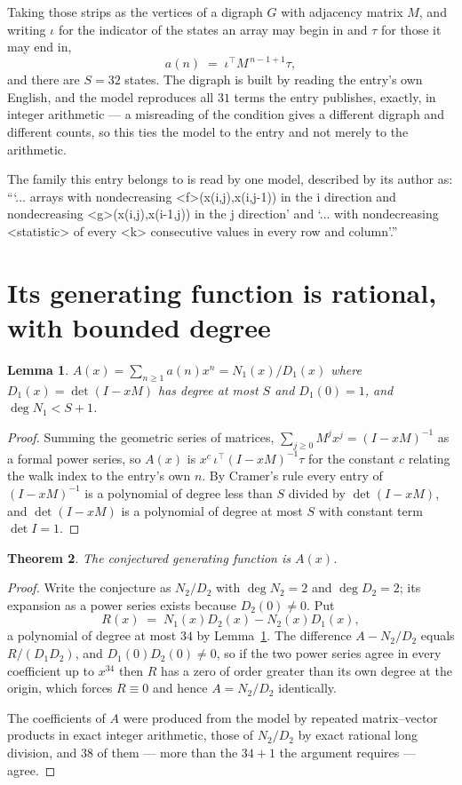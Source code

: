 \documentclass[11pt,a4paper]{article}
\theoremstyle{plain}
\newtheorem{theorem}{Theorem}
\newtheorem{lemma}[theorem]{Lemma}
\theoremstyle{definition}
\begin{document}
Taking those strips as the vertices of a digraph $G$ with adjacency matrix $M$, and writing
$\iota$ for the indicator of the states an array may begin in and $\tau$ for those it may end
in,
\[
a(n)\;=\;\iota^{\!\top}M^{\,n-1+1}\tau ,
\]
and there are $S=32$ states. The digraph is built by reading the entry's own English, and the
model reproduces all $31$ terms the entry publishes, exactly, in integer arithmetic --- a
misreading of the condition gives a different digraph and different counts, so this ties the
model to the entry and not merely to the arithmetic.

The family this entry belongs to is read by one model, described by its author as: ```... arrays with nondecreasing <f>(x(i,j),x(i,j-1)) in the i direction and nondecreasing <g>(x(i,j),x(i-1,j)) in the j direction' and `... with nondecreasing <statistic> of every <k> consecutive values in every row and column'.''


\section{Its generating function is rational, with bounded degree}

\begin{lemma}\label{lem:rat}
$A(x)=\sum_{n\ge1}a(n)x^n=N_1(x)/D_1(x)$ where $D_1(x)=\det(I-xM)$ has degree at most
$S$ and $D_1(0)=1$, and $\deg N_1<S+1$.
\end{lemma}

\begin{proof}
Summing the geometric series of matrices, $\sum_{j\ge0}M^jx^j=(I-xM)^{-1}$ as a formal
power series, so $A(x)$ is $x^{c}\,\iota^{\!\top}(I-xM)^{-1}\tau$ for the constant $c$
relating the walk index to the entry's own $n$. By Cramer's rule every entry of
$(I-xM)^{-1}$ is a polynomial of degree less than $S$ divided by $\det(I-xM)$, and
$\det(I-xM)$ is a polynomial of degree at most $S$ with constant term $\det I=1$.
\end{proof}

\begin{theorem}
The conjectured generating function is $A(x)$.
\end{theorem}

\begin{proof}
Write the conjecture as $N_2/D_2$ with $\deg N_2=2$ and $\deg D_2=2$; its expansion as a
power series exists because $D_2(0)\neq0$. Put
\[
R(x)\;=\;N_1(x)D_2(x)-N_2(x)D_1(x),
\]
a polynomial of degree at most $34$ by Lemma~\ref{lem:rat}. The difference
$A-N_2/D_2$ equals $R/(D_1D_2)$, and $D_1(0)D_2(0)\neq0$, so if the two power series agree in
every coefficient up to $x^{34}$ then $R$ has a zero of order greater than its own
degree at the origin, which forces $R\equiv0$ and hence $A=N_2/D_2$ identically.

The coefficients of $A$ were produced from the model by repeated matrix--vector products in
exact integer arithmetic, those of $N_2/D_2$ by exact rational long division, and $38$
of them --- more than the $34+1$ the argument requires --- agree.
\end{proof}
\end{document}
